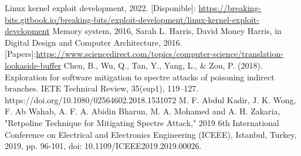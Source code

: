 \documentclass[lettersize,compsoc]{IEEEtran}
\begin{document}
\begin{thebibliography}{9}
 Linux kernel exploit development, 2022. [Disponible]: \url{https://breaking-bits.gitbook.io/breaking-bits/exploit-development/linux-kernel-exploit-development}
 Memory system, 2016, Sarah L. Harris, David Money Harris, in Digital Design and Computer Architecture, 2016. [Papers]:\url{https://www.sciencedirect.com/topics/computer-science/translation-lookaside-buffer}
 Chen, B., Wu, Q., Tan, Y., Yang, L., & Zou, P. (2018). Exploration for software mitigation to spectre attacks of poisoning indirect branches. IETE Technical Review, 35(sup1), 119–127. https://doi.org/10.1080/02564602.2018.1531072
 M. F. Abdul Kadir, J. K. Wong, F. Ab Wahab, A. F. A. Abidin Bharun, M. A. Mohamed and A. H. Zakaria, "Retpoline Technique for Mitigating Spectre Attack," 2019 6th International Conference on Electrical and Electronics Engineering (ICEEE), Istanbul, Turkey, 2019, pp. 96-101, doi: 10.1109/ICEEE2019.2019.00026.

\end{thebibliography}
\end{document}
